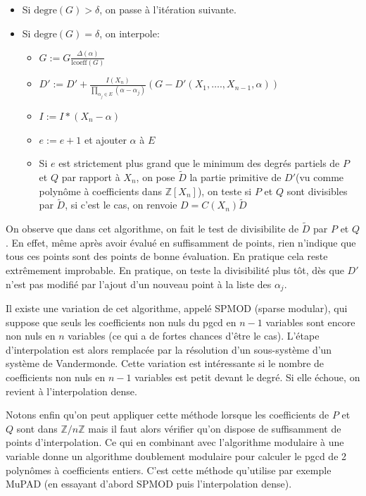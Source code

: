 \documentclass[a4paper,11pt]{article}
\begin{document}
\begin{enumerate}
\begin{itemize}
    \item Si $\mbox{degre} ( G ) > \delta$, on passe à l'itération suivante.
    
    \item Si $\mbox{degre} ( G ) = \delta$, on interpole:
    \begin{itemize}
      \item $G := G \frac{\Delta ( \alpha )}{\mbox{lcoeff} ( G )}$
      
      \item $D' := D' + \frac{I ( X_n )}{\prod_{\alpha_j \in E} ( \alpha -
      \alpha_j )} ( G - D' ( X_1, \ldots ., X_{n - 1}, \alpha ))$
      
      \item $I := I \ast ( X_n - \alpha )$
      
      \item $e := e + 1$ et ajouter $\alpha$ à $E$
      
      \item Si $e$ est strictement plus grand que le minimum des degrés
      partiels de $P$ et $Q$ par rapport à $X_n$, on pose $\tilde{D}$ la
      partie primitive de $D' $(vu comme polynôme à coefficients dans
      $\mathbb{Z} [ X_n ]$), on teste si $P$ et $Q$ sont divisibles par
      $\tilde{D}$, si c'est le cas, on renvoie $D = C ( X_n ) \tilde{D}$
    \end{itemize}
  \end{itemize}
\end{enumerate}
On observe que dans cet algorithme, on fait le test de divisibilite de
$\tilde{D}$ par $P$ et $Q$. En effet, même après avoir évalué en suffisamment
de points, rien n'indique que tous ces points sont des points de bonne
évaluation. En pratique cela reste extrêmement improbable. En pratique, on
teste la divisibilité plus tôt, dès que $D'$ n'est pas modifié par l'ajout
d'un nouveau point à la liste des $\alpha_j$.

Il existe une variation de cet algorithme, appelé SPMOD (sparse modular), qui
suppose que seuls les coefficients non nuls du pgcd en $n - 1$ variables sont
encore non nuls en $n$ variables (ce qui a de fortes chances d'être le cas).
L'étape d'interpolation est alors remplacée par la résolution d'un
sous-système d'un système de Vandermonde. Cette variation est intéressante si
le nombre de coefficients non nuls en $n - 1$ variables est petit devant le
degré. Si elle échoue, on revient à l'interpolation dense.

Notons enfin qu'on peut appliquer cette méthode lorsque les coefficients de
$P$ et $Q$ sont dans $\mathbb{Z} / n \mathbb{Z}$ mais il faut alors vérifier
qu'on dispose de suffisamment de points d'interpolation. Ce qui en combinant
avec l'algorithme modulaire à une variable donne un algorithme doublement
modulaire pour calculer le pgcd de 2 polynômes à coefficients entiers. C'est
cette méthode qu'utilise par exemple MuPAD (en essayant d'abord SPMOD puis
l'interpolation dense).
\end{document}
